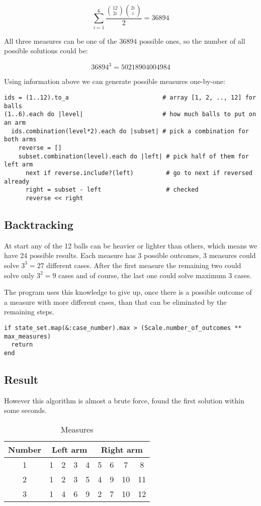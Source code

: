 \documentclass[11pt]{article} %
\begin{document}
\[ \sum_{i=1}^{6} \frac{\binom{12}{2i} \binom{2i}{i}}{2} = 36894 \]

All three measures can be one of the $36894$ possible ones, so the number of all possible solutions could be:

\[ 36894^3 = 50218904004984 \]

Using information above we can generate possible measures one-by-one:

\begin{verbatim}
ids = (1..12).to_a                          # array [1, 2, .., 12] for balls
(1..6).each do |level|                      # how much balls to put on an arm
  ids.combination(level*2).each do |subset| # pick a combination for both arms
    reverse = []
    subset.combination(level).each do |left| # pick half of them for left arm
      next if reverse.include?(left)         # go to next if reversed already
      right = subset - left                  # checked
      reverse << right
\end{verbatim}

\subsection{Backtracking}

At start any of the 12 balls can be heavier or lighter than others, which means we have 24 possible results. Each measure has 3 possible outcomes, 3 measures could solve $3^3 = 27$ different cases. After the first measure the remaining two could solve only $3^2 = 9$ cases and of course, the last one could solve maximum 3 cases.

The program uses this knowledge to give up, once there is a possible outcome of a measure with more different cases, than that can be eliminated by the remaining steps.

\begin{verbatim}
if state_set.map(&:case_number).max > (Scale.number_of_outcomes ** max_measures)
  return
end
\end{verbatim}

\subsection{Result} \label{one_result}

However this algorithm is almost a brute force, found the first solution within some seconds.

\begin{table}[h]
\begin{center}
\begin{tabular}{c|cccc|cccc}
  \toprule
  Number & \multicolumn{4}{c|}{Left arm} & \multicolumn{4}{c}{Right arm} \\
  \midrule
       1 & 1 & 2 & 3 & 4 & 5 & 6 & 7 & 8 \\
       2 & 1 & 2 & 3 & 5 & 4 & 9 & 10 & 11 \\
       3 & 1 & 4 & 6 & 9 & 2 & 7 & 10 & 12 \\
  \bottomrule
\end{tabular}
\end{center}
\caption{Measures}
\end{table}
\end{document}

